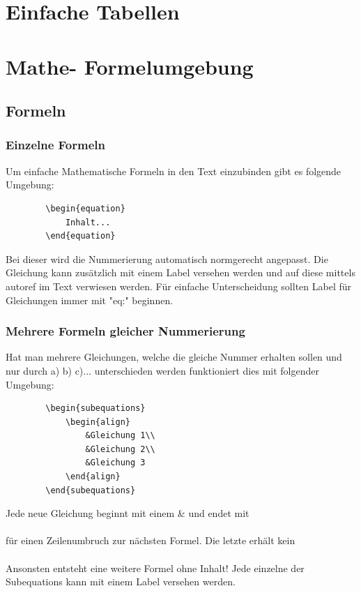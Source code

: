 \documentclass[
12pt,
a4paper,
headings=small,                    %
bibliography=totoc,                %
listof=totoc,                      %
parskip=half*,                     %
]{scrartcl}                        %
\begin{document}
	
	
	\newpage
	\section{Einfache Tabellen}




	
	\newpage
	\section{Mathe- Formelumgebung}
	\subsection{Formeln}
	\subsubsection{Einzelne Formeln}
	Um einfache Mathematische Formeln in den Text einzubinden gibt es folgende Umgebung:
	\begin{verbatim}
		\begin{equation}
			Inhalt...
		\end{equation}
	\end{verbatim}
	Bei dieser wird die Nummerierung automatisch normgerecht angepasst. Die Gleichung kann zusätzlich mit einem Label versehen werden und auf diese mittels autoref im Text verwiesen werden. Für einfache Unterscheidung sollten Label für Gleichungen immer mit "eq:" beginnen.
	\subsubsection{Mehrere Formeln gleicher Nummerierung}
	Hat man mehrere Gleichungen, welche die gleiche Nummer erhalten sollen und nur durch a) b) c)... unterschieden werden funktioniert dies mit folgender Umgebung:
	\begin{verbatim}
		\begin{subequations}
			\begin{align}
				&Gleichung 1\\
				&Gleichung 2\\
				&Gleichung 3
			\end{align}
		\end{subequations}
	\end{verbatim}
	Jede neue Gleichung beginnt mit einem \& und endet mit \\\\ für einen Zeilenumbruch zur nächsten Formel. Die letzte erhält kein \\\\ Ansonsten entsteht eine weitere Formel ohne Inhalt! \newline
	Jede einzelne der Subequations kann mit einem Label versehen werden.
\end{document}

